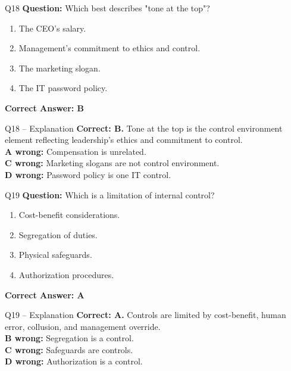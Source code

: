 \documentclass[aspectratio=169,10pt]{beamer}
\begin{document}
	\begin{frame}[t]{Q18}
		\small
		\textbf{Question:} Which best describes "tone at the top"?
		\begin{enumerate}[label=\Alph*.,itemsep=1pt,topsep=2pt]
			\item The CEO's salary.
			\item Management's commitment to ethics and control.
			\item The marketing slogan.
			\item The IT password policy.
		\end{enumerate}
		\vspace{4pt}
		\textbf{Correct Answer: B}
	\end{frame}
	
	\begin{frame}[t]{Q18 -- Explanation}
		\small
		\textbf{Correct: B.} Tone at the top is the control environment element reflecting leadership's ethics and commitment to control. \\[4pt]
		\textbf{A wrong:} Compensation is unrelated. \\[2pt]
		\textbf{C wrong:} Marketing slogans are not control environment. \\[2pt]
		\textbf{D wrong:} Password policy is one IT control.
	\end{frame}
	
	\begin{frame}[t]{Q19}
		\small
		\textbf{Question:} Which is a limitation of internal control?
		\begin{enumerate}[label=\Alph*.,itemsep=1pt,topsep=2pt]
			\item Cost-benefit considerations.
			\item Segregation of duties.
			\item Physical safeguards.
			\item Authorization procedures.
		\end{enumerate}
		\vspace{4pt}
		\textbf{Correct Answer: A}
	\end{frame}
	
	\begin{frame}[t]{Q19 -- Explanation}
		\small
		\textbf{Correct: A.} Controls are limited by cost-benefit, human error, collusion, and management override. \\[4pt]
		\textbf{B wrong:} Segregation is a control. \\[2pt]
		\textbf{C wrong:} Safeguards are controls. \\[2pt]
		\textbf{D wrong:} Authorization is a control.
	\end{frame}
	
\end{document}
